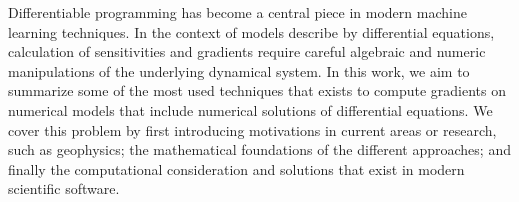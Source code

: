 Differentiable programming has become a central piece in modern machine learning techniques. 
In the context of models describe by differential equations, calculation of sensitivities and gradients require careful algebraic and numeric manipulations of the underlying dynamical system.
In this work, we aim to summarize some of the most used techniques that exists to compute gradients on numerical models that include numerical solutions of differential equations. 
We cover this problem by first introducing motivations in current areas or research, such as geophysics; the mathematical foundations of the different approaches; and finally the computational consideration and solutions that exist in modern scientific software. 